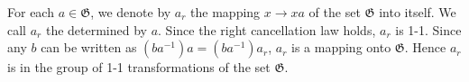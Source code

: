 For each $a \in \mathfrak{G}$, we denote by $a_r$ the mapping $x \to xa$ of the set $\mathfrak{G}$ into itself. We call $a_r$ the  determined by $a$. Since the right cancellation law holds, $a_r$ is 1-1. Since any $b$ can be written as $(ba^{-1})a = (ba^{-1})a_r$, $a_r$ is a mapping onto $\mathfrak{G}$. Hence $a_r$ is in the group of 1-1 transformations of the set $\mathfrak{G}$.
